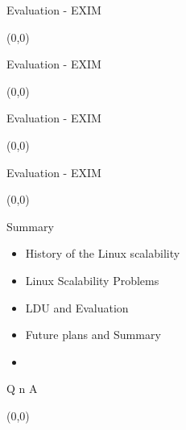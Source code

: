 \documentclass[english]{beamer} %
\begin{document}
\begin{frame}{Evaluation - EXIM}
\begin{textblock}{1}(0,0)
\end{textblock}
\end{frame}

\begin{frame}{Evaluation - EXIM}
\begin{textblock}{1}(0,0)
\end{textblock}
\end{frame}

\begin{frame}{Evaluation - EXIM}
\begin{textblock}{1}(0,0)
\end{textblock}
\end{frame}


\begin{frame}{Evaluation - EXIM}
\begin{textblock}{1}(0,0)
\end{textblock}
\end{frame}

\begin{frame}{Summary}
	\begin{itemize}
	\item History of the Linux scalability 
	\item Linux Scalability Problems
	\item LDU and Evaluation
	\item Future plans and Summary
	\item {}
	\end{itemize}
\end{frame}


\begin{frame}{Q n A}
\begin{textblock}{1}(0,0)
\end{textblock}
\end{frame}
\end{document}
